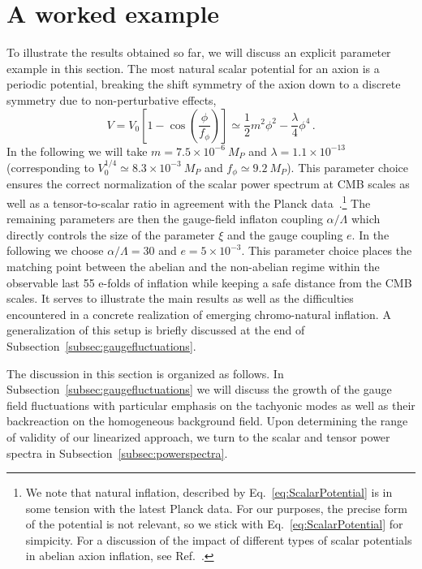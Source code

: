 \section{A worked example \label{sec:example}}
 
 To illustrate the results obtained so far, we will discuss an explicit parameter example in this section. The most natural scalar potential for an axion is a periodic potential, breaking the shift symmetry of the axion down to a discrete symmetry due to non-perturbative effects,
 \begin{equation}
  V = V_0 \left[1 - \cos\left( \frac{\phi}{f_\phi} \right) \right] \simeq \frac{1}{2} m^2 \phi^2 - \frac{\lambda}{4} \phi^4 \,.
  \label{eq:ScalarPotential}
 \end{equation}
In the following we will take $m = 7.5 \times 10^{-6}~M_P$ and $\lambda = 1.1 \times 10^{-13}$ (corresponding to $V_0^{1/4} 
\simeq 8.3 \times 10^{-3}~M_P$ and $f_\phi \simeq 9.2~M_P$). This parameter choice ensures the correct normalization of the scalar power spectrum at CMB scales as well as a tensor-to-scalar ratio in agreement with the Planck data~\cite{Ade:2015lrj}.\footnote{We note that natural inflation, described by Eq.~\eqref{eq:ScalarPotential} is in some tension with the latest Planck data. For our purposes, the precise form of the potential is not relevant, so we stick with Eq.~\eqref{eq:ScalarPotential} for simpicity. For a discussion of the impact of different types of scalar potentials in abelian axion inflation, see Ref.~\cite{Domcke:2016bkh}.} 
The remaining parameters are then the gauge-field inflaton coupling $\alpha/\Lambda$ which directly controls the size of the parameter $\xi$ and the gauge coupling $e$. In the following we choose $\alpha/\Lambda = 30$ and $e = 5 \times 10^{-3}$. This parameter choice places the matching point between the abelian and the non-abelian regime within the observable last 55 e-folds of inflation while keeping a safe distance from the CMB scales. It serves to illustrate the main results as well as the difficulties encountered in a concrete realization of emerging chromo-natural inflation. A generalization of this setup is briefly discussed at the end of Subsection~\ref{subsec:gaugefluctuations}.
 
 The discussion in this section is organized as follows. In Subsection~\ref{subsec:gaugefluctuations} we will discuss the growth of the gauge field fluctuations with particular emphasis on the tachyonic modes as well as their backreaction on the homogeneous background field. Upon determining the range of validity of our linearized approach, we turn to the scalar and tensor power spectra in Subsection~\ref{subsec:powerspectra}.
 
